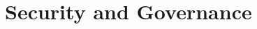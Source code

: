 \newpage\sloppy
\setlength{\RaggedRightRightskip}{0pt plus 2em}
\section{Security and Governance}

\fussy
